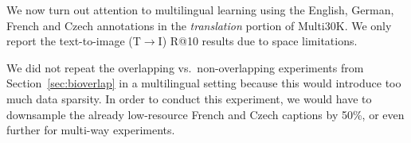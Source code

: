 We now turn out attention to multilingual learning using the English, German, French and Czech annotations in the {\it translation} portion of Multi30K. We only report the text-to-image (T$\rightarrow$I) R@10 results due to space limitations. 

We did not repeat the overlapping vs.\ non-overlapping experiments from Section~\ref{sec:bioverlap} in a multilingual setting because this would introduce too much data sparsity. In order to conduct this experiment, we would have to downsample the already low-resource French and Czech captions by 50\%, or even further for multi-way experiments.

